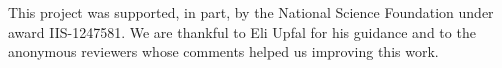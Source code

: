 \documentclass{svjour3}                     %
\begin{document}
\begin{acknowledgements}
This project was supported, in part, by the National Science Foundation under
award IIS-1247581. We are thankful to Eli Upfal for his guidance and to the
anonymous reviewers whose comments helped us improving this work.
\end{acknowledgements}



\end{document}
